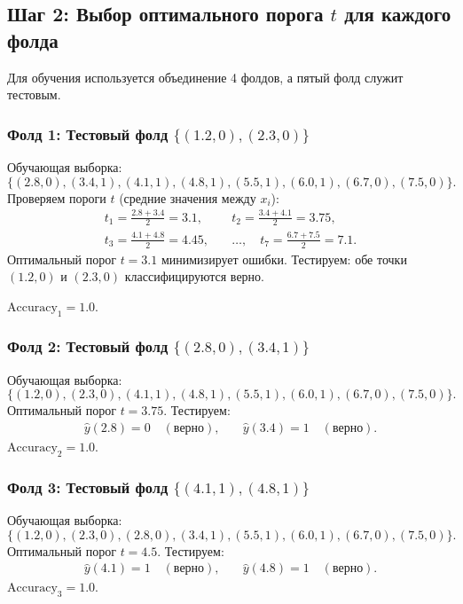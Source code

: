 \subsection*{Шаг 2: Выбор оптимального порога \( t \) для каждого фолда}

Для обучения используется объединение 4 фолдов, а пятый фолд служит тестовым. 

\subsubsection*{Фолд 1: Тестовый фолд \(\{(1.2, 0), (2.3, 0)\}\)}
Обучающая выборка:
\[
\{(2.8, 0), (3.4, 1), (4.1, 1), (4.8, 1), (5.5, 1), (6.0, 1), (6.7, 0), (7.5, 0)\}.
\]
Проверяем пороги \( t \) (средние значения между \( x_i \)):
\[
\begin{aligned}
t_1 = \frac{2.8 + 3.4}{2} = 3.1, & \quad t_2 = \frac{3.4 + 4.1}{2} = 3.75, \\
t_3 = \frac{4.1 + 4.8}{2} = 4.45, & \quad \dots, \quad t_7 = \frac{6.7 + 7.5}{2} = 7.1.
\end{aligned}
\]
Оптимальный порог \( t = 3.1 \) минимизирует ошибки. Тестируем: обе точки \((1.2, 0)\) и \((2.3, 0)\) классифицируются верно. 

\(\text{Accuracy}_1 = 1.0\).

\subsubsection*{Фолд 2: Тестовый фолд \(\{(2.8, 0), (3.4, 1)\}\)}
Обучающая выборка:
\[
\{(1.2, 0), (2.3, 0), (4.1, 1), (4.8, 1), (5.5, 1), (6.0, 1), (6.7, 0), (7.5, 0)\}.
\]
Оптимальный порог \( t = 3.75 \). Тестируем:
\[
\begin{aligned}
\hat{y}(2.8) = 0 \quad (\text{верно}), & \quad \hat{y}(3.4) = 1 \quad (\text{верно}).
\end{aligned}
\]
\(\text{Accuracy}_2 = 1.0\).

\subsubsection*{Фолд 3: Тестовый фолд \(\{(4.1, 1), (4.8, 1)\}\)}
Обучающая выборка:
\[
\{(1.2, 0), (2.3, 0), (2.8, 0), (3.4, 1), (5.5, 1), (6.0, 1), (6.7, 0), (7.5, 0)\}.
\]
Оптимальный порог \( t = 4.5 \). Тестируем:
\[
\begin{aligned}
\hat{y}(4.1) = 1 \quad (\text{верно}), & \quad \hat{y}(4.8) = 1 \quad (\text{верно}).
\end{aligned}
\]
\(\text{Accuracy}_3 = 1.0\).

